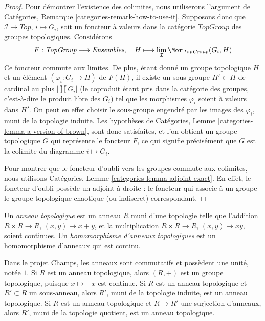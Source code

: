 \begin{proof}
Pour démontrer l'existence des colimites, nous utiliserons l'argument de
Catégories, Remarque \ref{categories-remark-how-to-use-it}. Supposons donc que
$\mathcal{I} \to \textit{Top}$, $i \mapsto G_i$, soit un foncteur à valeurs
dans la catégorie $\textit{TopGroup}$ des groupes topologiques. Considérons
$$
F : \textit{TopGroup} \longrightarrow \textit{Ensembles},\quad
H \longmapsto \lim_\mathcal{I} \Mor_{\textit{TopGroup}}(G_i, H)
$$
Ce foncteur commute aux limites. De plus, étant donné un groupe topologique
$H$ et un élément $(\varphi_i : G_i \to H)$ de $F(H)$, il existe un
sous-groupe $H' \subset H$ de cardinal au plus $|\coprod G_i|$ (le coproduit
étant pris dans la catégorie des groupes, c'est-à-dire le produit libre des
$G_i$) tel que les morphismes $\varphi_i$ soient à valeurs dans $H'$. On peut
en effet choisir le sous-groupe engendré par les images des $\varphi_i$, muni
de la topologie induite. Les hypothèses de Catégories, Lemme
\ref{categories-lemma-a-version-of-brown}, sont donc satisfaites, et l'on
obtient un groupe topologique $G$ qui représente le foncteur $F$, ce qui
signifie précisément que $G$ est la colimite du diagramme $i \mapsto G_i$.

\medskip\noindent
Pour montrer que le foncteur d'oubli vers les groupes commute aux colimites,
nous utilisons Catégories, Lemme \ref{categories-lemma-adjoint-exact}. En
effet, le foncteur d'oubli possède un adjoint à droite : le foncteur qui associe
à un groupe le groupe topologique chaotique (ou indiscret) correspondant.
\end{proof}

\begin{definition}
\label{definition-topological-ring}
Un {\it anneau topologique} est un anneau $R$ muni d'une topologie telle que
l'addition $R \times R \to R$, $(x, y) \mapsto x + y$, et la multiplication
$R \times R \to R$, $(x, y) \mapsto xy$, soient continues.
Un {\it homomorphisme d'anneaux topologiques} est un homomorphisme d'anneaux
qui est continu.
\end{definition}

\noindent
Dans le projet Champs, les anneaux sont commutatifs et possèdent une unité,
notée $1$. Si $R$ est un anneau topologique, alors $(R, +)$ est un groupe
topologique, puisque
$x \mapsto -x$ est continue. Si $R$ est un anneau topologique et
$R' \subset R$ un sous-anneau, alors $R'$, muni de la topologie induite, est
un anneau topologique. Si $R$ est un anneau topologique et $R \to R'$ une
surjection d'anneaux, alors $R'$, muni de la topologie quotient, est un anneau
topologique.

